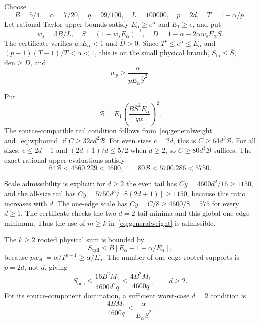 \documentclass[11pt]{article}
\theoremstyle{plain}
\theoremstyle{remark}
\begin{document}
Choose
\begin{equation}\label{eq:generalparams}
B=5/4,\quad \alpha=7/20,\quad q=99/100,\quad L=100000,
\quad p=2d,\quad T=1+\alpha/p.
\end{equation}
Let rational Taylor upper bounds satisfy $E_\alpha\ge e^\alpha$ and $E_1\ge e$,
and put
\[
w_s=3B/L,\quad \overline S=(1-w_sE_\alpha)^{-1},\quad
\overline D=1-\alpha-2\alpha w_sE_\alpha\overline S.
\]
The certificate verifies $w_sE_\alpha<1$ and $\overline D>0$.
Since $T^p\le e^\alpha\le E_\alpha$ and
$(p-1)(T-1)/T<\alpha<1$, this is on the small physical branch,
$S_\mathrm{hi}\le\overline S$, $\mathrm{den}\ge\overline D$, and
\begin{equation}\label{eq:wpbound}
w_p\ge\frac{\alpha}{pE_\alpha\overline S^2}.
\end{equation}

Put
\begin{equation}\label{eq:base}
\mathcal B=E_1\left(\frac{B\overline S^2E_\alpha}{q\alpha}\right)^2.
\end{equation}
The source-compatible tail condition follows from~\eqref{eq:generalweight}
and~\eqref{eq:wpbound} if $C\ge32cd^2\mathcal B$.
For even sizes $c=2d$, this is $C\ge64d^3\mathcal B$.
For all sizes, $c\le2d+1$ and $(2d+1)/d\le5/2$ when $d\ge2$, so
$C\ge80d^3\mathcal B$ suffices.
The exact rational upper evaluations satisfy
\begin{equation}\label{eq:Kvalues}
64\mathcal B<4560.229<4600,\qquad
80\mathcal B<5700.286<5750.
\end{equation}

Scale admissibility is explicit: for $d\ge2$ the even tail has
$Cy=4600d^2/16\ge1150$, and the all-size tail has
$Cy=5750d^3/[8(2d+1)]\ge1150$, because this ratio increases with $d$.
The one-edge scale has $Cy=C/8\ge4600/8=575$ for every $d\ge1$.
The certificate checks the two $d=2$ tail minima and this global one-edge
minimum. Thus the use of $m\ge k$ in~\eqref{eq:generalweight} is admissible.

The $k\ge2$ rooted physical sum is bounded by
\begin{equation}\label{eq:generaltail}
S_{\mathrm{tail}}\le B[E_\alpha-1-\alpha/E_\alpha],
\end{equation}
because $pw_{\mathrm{eff}}=\alpha/T^{p-1}\ge\alpha/E_\alpha$.
The number of one-edge rooted supports is $p=2d$, not $d$, giving
\begin{equation}\label{eq:generalone}
S_{\mathrm{one}}\le\frac{16B^2M_1}{4600d^2q}
\le\frac{4B^2M_1}{4600q},\qquad d\ge2.
\end{equation}
For its source-component domination, a sufficient worst-case $d=2$ condition is
\begin{equation}\label{eq:onesource}
\frac{4BM_1}{4600q}\le\frac{\alpha}{E_\alpha\overline S^2}.
\end{equation}
\end{document}
